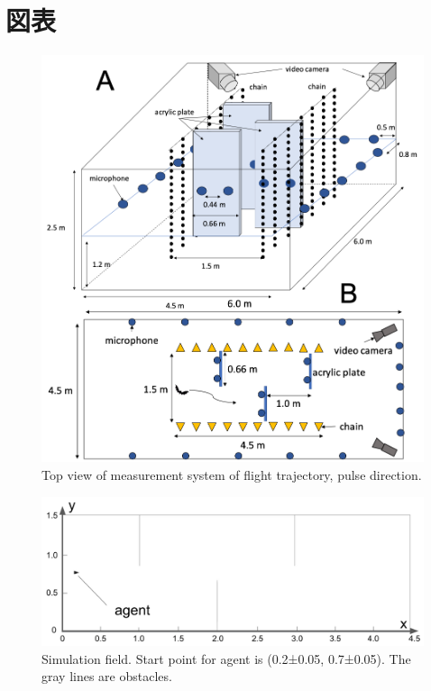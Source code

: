 \documentclass[../main]{subfiles}
\begin{document}
\newpage
\chapter*{図表}

\renewcommand{\figurename}{Fig. } %
\renewcommand{\tablename}{Table } %

\makeatletter
{}
\makeatother

\def\thefigure{\arabic{figure}}
\def\thetable{\arabic{table}}


\begin{figure}[H]
  \centering
  \includegraphics[width=12cm]{figures/top_view_measure.png}
  \caption{
    Top view of measurement system of flight trajectory,
    pulse direction.
  }
  \label{fig:top_view_measure}
\end{figure}

\newpage
{}
\begin{figure}[H]
  \centering
  \vfill
  \includegraphics[width=15cm]{figures/simulation_field.png}
  \caption{
    Simulation field.
    Start point for agent is (0.2±0.05, 0.7±0.05).
    The gray lines are obstacles.
  }\label{fig:simulation_field}
\end{figure}
\end{document}
